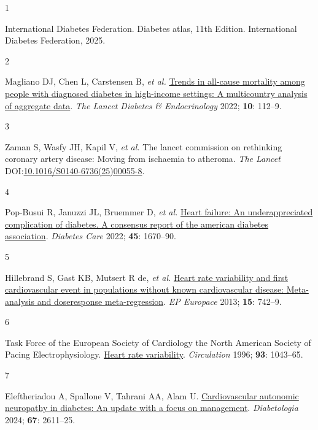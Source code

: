 \documentclass[
  letterpaper,
  headsepline=true,
  open=any]{scrbook}
\newlength{\cslhangindent}
\newlength{\csllabelwidth}
\newlength{\cslentryspacingunit} %
\newenvironment{CSLReferences}[2] %
 {%
  \setlength{\parindent}{0pt}
  \ifodd #1
  \let\oldpar\par
  \def\par{\hangindent=\cslhangindent\oldpar}
  \fi
  \setlength{\parskip}{#2\cslentryspacingunit}
 }%
 {}
\newcommand{\CSLLeftMargin}[1]{\parbox[t]{\csllabelwidth}{#1}}
\newcommand{\CSLRightInline}[1]{\parbox[t]{\linewidth - \csllabelwidth}{#1}\break}
\begin{document}
\hypertarget{refs}{}
\begin{CSLReferences}{0}{0}
\leavevmode{}%
\CSLLeftMargin{1 }%
\CSLRightInline{International Diabetes Federation. Diabetes atlas, 11th
Edition. International Diabetes Federation, 2025.}

\leavevmode{}%
\CSLLeftMargin{2 }%
\CSLRightInline{Magliano DJ, Chen L, Carstensen B, \emph{et al.}
\href{https://doi.org/10.1016/S2213-8587(21)00327-2}{Trends in all-cause
mortality among people with diagnosed diabetes in high-income settings:
A multicountry analysis of aggregate data}. \emph{The Lancet Diabetes \&
Endocrinology} 2022; \textbf{10}: 112--9.}

\leavevmode{}%
\CSLLeftMargin{3 }%
\CSLRightInline{Zaman S, Wasfy JH, Kapil V, \emph{et al.} The lancet
commission on rethinking coronary artery disease: Moving from ischaemia
to atheroma. \emph{The Lancet}
DOI:\href{https://doi.org/10.1016/S0140-6736(25)00055-8}{10.1016/S0140-6736(25)00055-8}.}

\leavevmode{}%
\CSLLeftMargin{4 }%
\CSLRightInline{Pop-Busui R, Januzzi JL, Bruemmer D, \emph{et al.}
\href{https://doi.org/10.2337/dci22-0014}{Heart failure: An
underappreciated complication of diabetes. A consensus report of the
american diabetes association}. \emph{Diabetes Care} 2022; \textbf{45}:
1670--90.}

\leavevmode{}%
\CSLLeftMargin{5 }%
\CSLRightInline{Hillebrand S, Gast KB, Mutsert R de, \emph{et al.}
\href{https://doi.org/10.1093/europace/eus341}{Heart rate variability
and first cardiovascular event in populations without known
cardiovascular disease: Meta-analysis and dose{\textendash}response
meta-regression}. \emph{EP Europace} 2013; \textbf{15}: 742--9.}

\leavevmode{}%
\CSLLeftMargin{6 }%
\CSLRightInline{Task Force of the European Society of Cardiology the
North American Society of Pacing Electrophysiology.
\href{https://doi.org/doi:10.1161/01.CIR.93.5.1043}{Heart rate
variability}. \emph{Circulation} 1996; \textbf{93}: 1043--65.}

\leavevmode{}%
\CSLLeftMargin{7 }%
\CSLRightInline{Eleftheriadou A, Spallone V, Tahrani AA, Alam U.
\href{https://doi.org/10.1007/s00125-024-06242-0}{Cardiovascular
autonomic neuropathy in diabetes: An update with a focus on management}.
\emph{Diabetologia} 2024; \textbf{67}: 2611--25.}


\end{CSLReferences}
\end{document}
